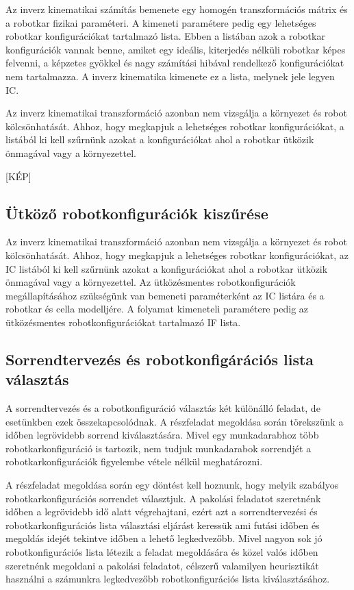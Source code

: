 Az inverz kinematikai számítás bemenete egy homogén transzformációs mátrix és a robotkar fizikai paraméteri. A kimeneti paramétere pedig egy lehetséges robotkar konfigurációkat tartalmazó lista. Ebben a listában azok a robotkar konfigurációk vannak benne, amiket egy ideális, kiterjedés nélküli robotkar képes felvenni, a képzetes gyökkel és nagy számítási hibával rendelkező konfigurációkat nem tartalmazza. A inverz kinematika kimenete ez a lista, melynek jele legyen IC.

Az inverz kinematikai transzformáció azonban nem vizsgálja a környezet és robot kölcsönhatását. Ahhoz, hogy megkapjuk a lehetséges robotkar konfigurációkat, a listából ki kell szűrnünk azokat a konfigurációkat ahol a robotkar ütközik önmagával vagy a környezettel.

[KÉP]
\subsection{Ütköző robotkonfigurációk kiszűrése}

Az inverz kinematikai transzformáció azonban nem vizsgálja a környezet és robot kölcsönhatását. Ahhoz, hogy megkapjuk a lehetséges robotkar konfigurációkat, az IC listából ki kell szűrnünk azokat a konfigurációkat ahol a robotkar ütközik önmagával vagy a környezettel. Az ütközésmentes robotkonfigurációk megállapításához szükségünk van bemeneti paraméterként az IC listára és a robotkar és cella modelljére. A folyamat kimeneteli paramétere pedig az ütközésmentes robotkonfigurációkat tartalmazó IF lista. 

\subsection{Sorrendtervezés és robotkonfigárációs lista választás}

A sorrendtervezés és a robotkonfiguráció választás két különálló feladat, de esetünkben ezek összekapcsolódnak. A részfeladat megoldása során törekszünk a időben legrövidebb sorrend kiválasztására. Mivel egy munkadarabhoz több robotkarkonfiguráció is tartozik, nem tudjuk munkadarabok sorrendjét a robotkarkonfigurációk figyelembe vétele nélkül meghatározni. 

A részfeladat megoldása során egy döntést kell hoznunk, hogy melyik szabályos robotkarkonfigurációs sorrendet választjuk.  
A pakolási feladatot szeretnénk időben a legrövidebb idő alatt végrehajtani, ezért azt a sorrendtervezési és robotkarkonfigurációs lista választási eljárást keressük ami futási időben és megoldás idejét tekintve időben a lehető legkedvezőbb.
Mivel nagyon sok jó robotkonfigurációs lista létezik a feladat megoldására és közel valós időben szeretnénk megoldani a pakolási feladatot, célszerű valamilyen heurisztikát használni a számunkra legkedvezőbb robotkonfigurációs lista kiválasztásához.  

